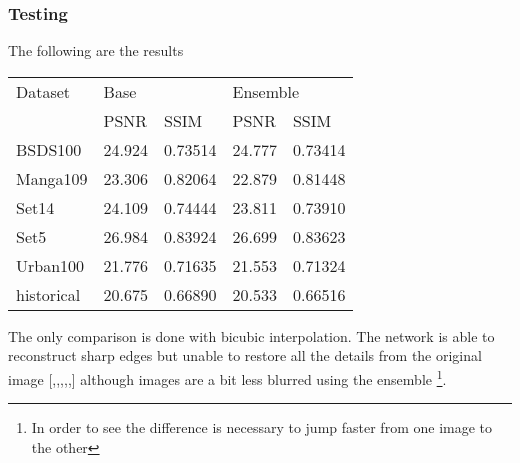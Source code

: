 \subsubsection{Testing}
The following are the results


\begin{table}[H]
    \begin{tabular}{lllll}
    Dataset    & \multicolumn{2}{l}{Base} & \multicolumn{2}{l}{Ensemble} \\
               & PSNR       & SSIM        & PSNR         & SSIM          \\
    BSDS100    & 24.924     & 0.73514     & 24.777       & 0.73414       \\
    Manga109   & 23.306     & 0.82064     & 22.879       & 0.81448       \\
    Set14      & 24.109     & 0.74444     & 23.811       & 0.73910       \\
    Set5       & 26.984     & 0.83924     & 26.699       & 0.83623       \\
    Urban100   & 21.776     & 0.71635     & 21.553       & 0.71324       \\
    historical\footnotemark & 20.675     & 0.66890     & 20.533       & 0.66516      
    \end{tabular}
    \end{table}

The only comparison is done with bicubic interpolation. 
The network is able to reconstruct sharp edges but unable to restore all the details from the original image [,,,,,] although images are a bit less blurred using the ensemble \footnote{In order to see the difference is necessary to jump faster from one image to the other}.


